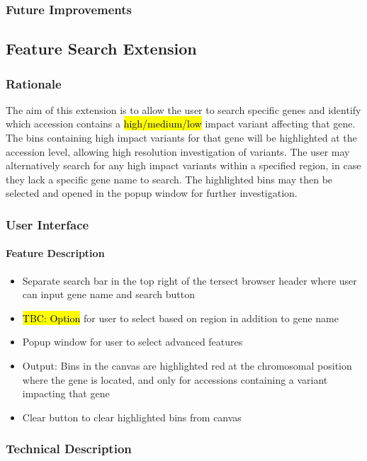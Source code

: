 \documentclass[12pt]{article}
\begin{document}
\subsubsection{Future Improvements}

\subsection{Feature Search Extension}
\subsubsection{Rationale}
The aim of this extension is to allow the user to search specific genes and identify which accession contains a \hl{high/medium/low} impact variant affecting that gene. The bins containing high impact variants for that gene will be highlighted at the accession level, allowing high resolution investigation of variants. The user may alternatively search for any high impact variants within a specified region, in case they lack a specific gene name to search. The highlighted bins may then be selected and opened in the popup  window for further investigation.

\subsubsection{User Interface}
\paragraph{Feature Description}
\begin{itemize}
    \item Separate search bar in the top right of the tersect browser header where user can input gene name and search button 
    \item \hl{TBC: Option} for user to select based on region in addition to gene name 
    \item Popup window for user to select advanced features 
    \item Output: Bins in the canvas are highlighted red at the chromosomal position where the gene is located, and only for accessions containing a variant impacting that gene 
    \item Clear button to clear highlighted bins from canvas 
\end{itemize}
\subsubsection{Technical Description}
\end{document}
